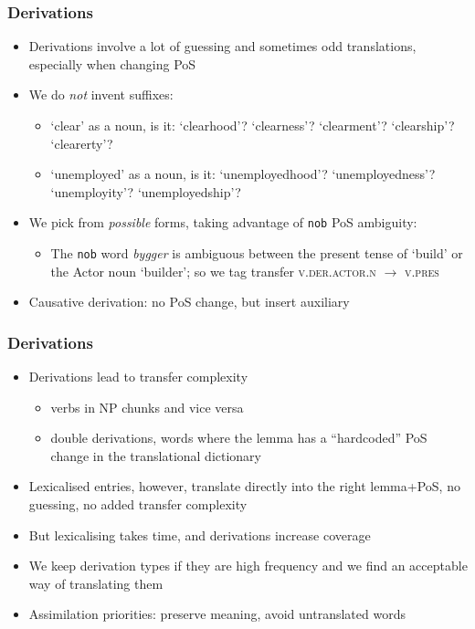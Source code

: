 \documentclass[notes=hide]{beamer}
\newcommand{\nob}{{\tt nob}}
\begin{document}
\begin{frame}\frametitle{Derivations}
  \begin{itemize}
  \item Derivations involve a lot of guessing and sometimes odd
    translations, especially when changing PoS
  \item We do \textit{not} invent suffixes:
    \begin{itemize}
    \item `clear' as a noun, is it: `clearhood'? `clearness'?
      `clearment'? `clearship'? `clearerty'?
    \item `unemployed' as a noun, is it: `unemployedhood'?
      `unemployedness'? `unemployity'? `unemployedship'?
    \end{itemize}
  \item We pick from \textit{possible} forms, taking advantage of
    \nob{} PoS ambiguity:
    \begin{itemize}
    \item The \nob{} word \textit{bygger} is ambiguous between the
      present tense of `build' or the Actor noun `builder'; so we tag
      transfer \textsc{v.der.actor.n} $\rightarrow$ \textsc{v.pres}
    \end{itemize}
  \item Causative derivation: no PoS change, but insert auxiliary
  \end{itemize}
\end{frame}

\begin{frame}
  \frametitle{Derivations}
  \begin{itemize}
  \item Derivations lead to transfer complexity
    \begin{itemize}
    \item verbs in NP chunks and vice versa
    \item double derivations, words where the lemma has a
      ``hardcoded'' PoS change in the translational dictionary
    \end{itemize}
  \item Lexicalised entries, however, translate directly into the
    right lemma+PoS, no guessing, no added transfer complexity
  \item But lexicalising takes time, and derivations increase coverage
  \item We keep derivation types if they are high frequency and we
    find an acceptable way of translating them
  \item Assimilation priorities: preserve meaning, avoid untranslated
    words
  \end{itemize}
\end{frame}
\end{document}
